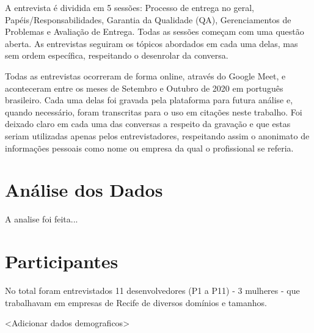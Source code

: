 A entrevista é dividida em 5 sessões: Processo de entrega no geral, Papéis/Responsabilidades, 
Garantia da Qualidade (QA), Gerenciamentos de Problemas e Avaliação de Entrega. Todas as sessões começam com uma questão aberta. As entrevistas seguiram os tópicos abordados em cada uma delas, mas sem ordem específica, respeitando o desenrolar da conversa.

Todas as entrevistas ocorreram de forma online, através do Google Meet, e aconteceram entre os meses de Setembro e Outubro de 2020 em português brasileiro. Cada uma delas foi gravada pela plataforma para futura análise e, quando necessário, foram transcritas para o uso em citações neste trabalho. Foi deixado claro em cada uma das conversas a respeito da gravação e que estas seriam utilizadas apenas pelos entrevistadores, respeitando assim o anonimato de informações pessoais como nome ou empresa da qual o profissional se referia.

\section{Análise dos Dados}

A analise foi feita... 


\section{Participantes}

No total foram entrevistados 11 desenvolvedores (P1 a P11) - 3 mulheres - que trabalhavam em empresas de Recife de diversos domínios e tamanhos. 

<Adicionar dados demograficos>
